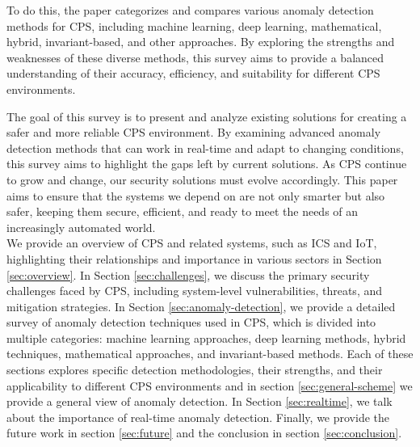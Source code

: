 To do this, the paper categorizes and compares various anomaly detection methods for CPS, including machine learning, deep learning, mathematical, hybrid, invariant-based, and other approaches. By exploring the strengths and weaknesses of these diverse methods, this survey aims to provide a balanced understanding of their accuracy, efficiency, and suitability for different CPS environments. 
\begin{comment}
Machine learning methods help to identify normal behavior patterns, deep learning techniques offer the ability to uncover complex and non-obvious patterns, mathematical methods provide rigorous modeling and formal verification, hybrid approaches combine strengths from multiple techniques for enhanced performance, and invariant-based methods establish system rules to detect deviations effectively. The system is designed to be flexible, learning from new data as the CPS environment changes, which helps it stay effective against new threats. This approach also focuses on using resources efficiently, which is important given the limited computing power of many CPS devices. By keeping the resource demands low, the system ensures that added security does not hurt overall performance.
\end{comment}
The goal of this survey is to present and analyze existing solutions for creating a safer and more reliable CPS environment. By examining advanced anomaly detection methods that can work in real-time and adapt to changing conditions, this survey aims to highlight the gaps left by current solutions. As CPS continue to grow and change, our security solutions must evolve accordingly. This paper aims to ensure that the systems we depend on are not only smarter but also safer, keeping them secure, efficient, and ready to meet the needs of an increasingly automated world.\\

 We provide an overview of CPS and related systems, such as ICS and IoT, highlighting their relationships and importance in various sectors in Section \ref{sec:overview}. In Section \ref{sec:challenges}, we discuss the primary security challenges faced by CPS, including system-level vulnerabilities, threats, and mitigation strategies. In Section \ref{sec:anomaly-detection}, we provide a detailed survey of anomaly detection techniques used in CPS, which is divided into multiple categories: machine learning approaches, deep learning methods, hybrid techniques, mathematical approaches, and invariant-based methods. Each of these sections explores specific detection methodologies, their strengths, and their applicability to different CPS environments and in section \ref{sec:general-scheme} we provide a general view of anomaly detection. In Section \ref{sec:realtime}, we talk about the importance of real-time anomaly detection. Finally, we provide the future work in section \ref{sec:future} and the conclusion in section \ref{sec:conclusion}.

